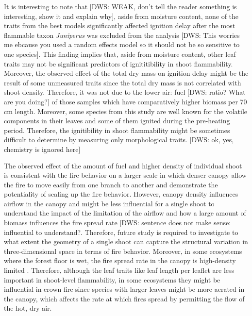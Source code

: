 \documentclass[12pt]{report}
\begin{document}
It is interesting to note that [DWS: WEAK, don't tell the reader something is interesting, show it and explain why], aside from moisture content, none of the traits from the best models significantly affected ignition delay after the most flammable taxon \emph{Juniperus} was excluded from the analysis [DWS: This worries me ebcause you used a random effects model so it should not be so sensitive to one species]. This finding implies that, aside from moisture content, other leaf traits may not be significant predictors of ignititibility in shoot flammability. Moreover, the observed effect of the total dry mass on ignition delay might be the result of some unmeasured traits since the total dry mass is not correlated with shoot density. Therefore, it was not due to the lower air: fuel [DWS: ratio? What are you doing?] of those samples which have comparatively higher biomass per 70\,cm length. Moreover, some species from this study are well known for the volatile components in their leaves and some of them  ignited during the pre-heating period. Therefore, the ignitibility in shoot flammability might be sometimes difficult to determine by measuring only morphological traits.  [DWS: ok, yes, chemistry is ignored here]

The observed effect of the amount of fuel and higher density of individual shoot is consistent with the fire behavior on a larger scale in which denser canopy allow the fire to move easily from one branch to another \citep{bond1996fire} and demonstrate the potentiality of scaling up the fire behavior. However, canopy density influences airflow in the canopy \citep{cionco1978analysis} and might be less influential for a single shoot to understand the impact of the limitation of the airflow and how a large amount of biomass influences the fire spread rate [DWS: sentence does not make sense: influential to understand?. Therefore, future study is required to investigate to what extent the geometry of a single shoot can capture the structural variation in three-dimensional space in terms of fire behavior. Moreover, in some ecosystems where the forest floor is wet, the fire spread rate in the canopy is high-density limited  \citep{ray2005micrometeorological}. Therefore, although the leaf traits like leaf length per leaflet are less important in shoot-level flammability, in some ecosystems they might be influential in crown fire since species with larger leaves might be more aerated in the canopy, which affects the rate at which fires spread by permitting the flow of the hot, dry air. 
\end{document}

